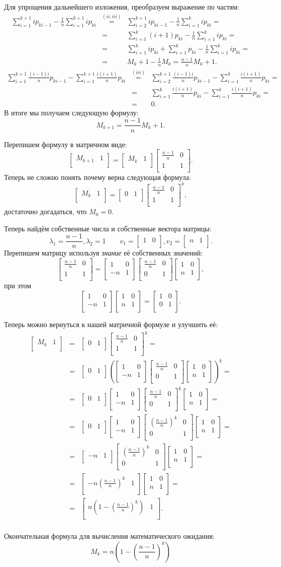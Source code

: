\documentclass[draft]{article}
\newcommand{\vect}[2]{\left[\begin{array}{cc}#1 & #2\\ \end{array}\right]}
\newcommand{\matr}[4]{\left[\begin{array}{cc}#1 & #2\\ #3 & #4 \\ \end{array}\right]}
\begin{document}
Для упрощения дальнейшего изложения, преобразуем выражение по частям:
\begin{eqnarray*}
  \sum_{i=1}^{k+1}{i p_{{k}{i-1}} - \frac{1}{n}\sum_{i=1}^{k+1}{i p_{{k}{i}}}} & \stackrel{(ii,iii)}{=} & \sum_{i=2}^{k+1}{i p_{{k}{i-1}} - \frac{1}{n}\sum_{i=1}^{k}{i p_{{k}{i}}}} = \\
          & = & \sum_{i=1}^{k}{(i + 1) p_{{k}{i}} - \frac{1}{n}\sum_{i=1}^{k}{i p_{{k}{i}}}} = \\
          & = & \sum_{i=1}^{k}{i p_{{k}{i}} + \sum_{i=1}^{k}{p_{{k}{i}}} - \frac{1}{n}\sum_{i=1}^{k}{i p_{{k}{i}}}} = \\
          & = & M_k + 1 - \frac{1}{n}M_k = \frac{n - 1}{n}M_k + 1.
\end{eqnarray*}
\begin{eqnarray*}
\sum_{i=1}^{k+1}{\frac{(i-1)i}{n} p_{{k}{i - 1}}} - \sum_{i=1}^{k+1}{\frac{i(i+1)}{n} p_{{k}{i}}} & \stackrel{(iii)}{=} & \sum_{i=2}^{k+1}{\frac{(i-1)i}{n} p_{{k}{i - 1}}} - \sum_{i=1}^{k}{\frac{i(i+1)}{n} p_{{k}{i}}} = \\
          & = & \sum_{i=1}^{k}{\frac{i(i+1)}{n} p_{{k}{i}}} - \sum_{i=1}^{k}{\frac{i(i+1)}{n} p_{{k}{i}}} = \\
          & = & 0.
\end{eqnarray*}
В итоге мы получаем следующую формулу:
\[
  M_{k+1} = \frac{n-1}{n}M_k + 1.
\]

Перепишем формулу в матричном виде:
\[
  \vect{M_{k+1}}{1} = \vect{M_{k}}{1}\matr{\frac{n-1}{n}}{0}{1}{1}.
\]
Теперь не сложно понять почему верна следующая формула:
\[
  \vect{M_k}{1} = \vect{0}{1}{\matr{\frac{n-1}{n}}{0}{1}{1}}^k,
\]
достаточно догадаться, что $M_0 = 0.$

Теперь найдём собственные числа и собственные вектора матрицы:
\[
  \lambda_1 = \frac{n-1}{n}, \lambda_2 = 1 \qquad v_1 = \vect{1}{0}, v_2 = \vect{n}{1}.
\]
Перепишем матрицу используя {\it знание} её собственных значений:
\[
  \matr{\frac{n-1}{n}}{0}{1}{1} = \matr{1}{0}{-n}{1} \matr{\frac{n-1}{n}}{0}{0}{1} \matr{1}{0}{n}{1},
\]
при этом
\[
  \matr{1}{0}{-n}{1} \matr{1}{0}{n}{1} = \matr{1}{0}{0}{1}.
\]

Теперь можно вернуться к нашей матричной формуле и улучшить её:
\begin{eqnarray*}
  \vect{M_k}{1} & = & \vect{0}{1}{\matr{\frac{n-1}{n}}{0}{1}{1}}^k = \\
          & = & \vect{0}{1}\left(\matr{1}{0}{-n}{1} \matr{\frac{n-1}{n}}{0}{0}{1} \matr{1}{0}{n}{1}\right)^k = \\
          & = & \vect{0}{1}\matr{1}{0}{-n}{1} {\matr{\frac{n-1}{n}}{0}{0}{1}}^k \matr{1}{0}{n}{1} = \\
          & = & \vect{0}{1}\matr{1}{0}{-n}{1} \matr{(\frac{n-1}{n})^k}{0}{0}{1} \matr{1}{0}{n}{1} = \\
          & = & \vect{-n}{1} \matr{(\frac{n-1}{n})^k}{0}{0}{1} \matr{1}{0}{n}{1} = \\
          & = & \vect{-n(\frac{n-1}{n})^k}{1} \matr{1}{0}{n}{1} = \\
          & = & \vect{n(1-(\frac{n-1}{n})^k)}{1}. \\
\end{eqnarray*}

Окончательная формула для вычисления математического ожидания:
\[
  \boxed{M_k = n(1 - \left(\frac{n-1}{n}\right)^k)}
\]
\end{document}

